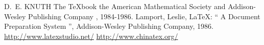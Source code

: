 \documentclass{mcmthesis}
\begin{document}
\begin{thebibliography}{99}
 D.~E. KNUTH   The \TeX{}book  the American
Mathematical Society and Addison-Wesley
Publishing Company , 1984-1986.
Lamport, Leslie,  \LaTeX{}: `` A Document Preparation System '',
Addison-Wesley Publishing Company, 1986.
\url{http://www.latexstudio.net/}
\url{http://www.chinatex.org/}
\end{thebibliography}
\end{document}
